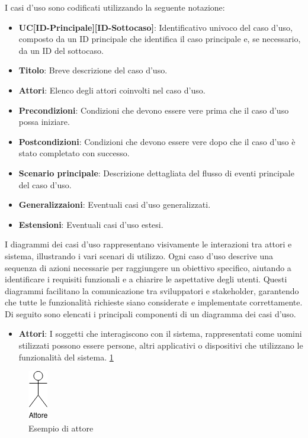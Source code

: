 I casi d'uso sono codificati utilizzando la seguente notazione:

\begin{itemize}
    \item \textbf{UC[ID-Principale][ID-Sottocaso]}: Identificativo univoco del caso d'uso, composto da un ID principale che identifica il caso principale e, se necessario, da un ID del sottocaso.
    \item \textbf{Titolo}: Breve descrizione del caso d'uso.
    \item \textbf{Attori}: Elenco degli attori coinvolti nel caso d'uso.
    \item \textbf{Precondizioni}: Condizioni che devono essere vere prima che il caso d'uso possa iniziare.
    \item \textbf{Postcondizioni}: Condizioni che devono essere vere dopo che il caso d'uso è stato completato con successo.
    \item \textbf{Scenario principale}: Descrizione dettagliata del flusso di eventi principale del caso d'uso.
    \item \textbf{Generalizzaioni}: Eventuali casi d'uso generalizzati.
    \item \textbf{Estensioni}: Eventuali casi d'uso estesi.
\end{itemize}

I diagrammi dei casi d’uso rappresentano visivamente le interazioni tra attori e sistema,
illustrando i vari scenari di utilizzo. Ogni caso d’uso descrive una sequenza di 
azioni necessarie per raggiungere un obiettivo specifico, aiutando a identificare i 
requisiti funzionali e a chiarire le aspettative degli utenti. Questi diagrammi 
facilitano la comunicazione tra sviluppatori e stakeholder, garantendo che tutte le 
funzionalità richieste siano considerate e implementate correttamente. 
Di seguito sono elencati i principali componenti di un diagramma dei casi d’uso.

\begin{itemize}
    \item \textbf{Attori}: I soggetti che interagiscono con il sistema, rappresentati come uomini stilizzati possono essere persone, altri applicativi o dispositivi che utilizzano le funzionalità del sistema. \ref{fig:attore}
\end{itemize}

\begin{figure}[H]
    \centering
    \includegraphics{../../../img/Attore.png}
    \caption{Esempio di attore}
    \label{fig:attore}
\end{figure}

